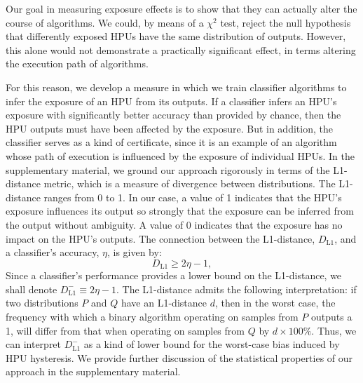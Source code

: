 \documentclass[12pt]{article}
\begin{document}
Our goal in measuring exposure effects is to show that they can actually 
alter the course of algorithms.
We could, by means of a $\chi^2$ test, reject the null hypothesis that
differently exposed HPUs have the same distribution of outputs.
However, this alone would not demonstrate a practically significant effect, in 
terms altering the execution path of algorithms.

For this reason, we develop a measure in which we train classifier algorithms 
to infer the exposure of an HPU from its outputs.
If a classifier infers an HPU's exposure with significantly 
better accuracy than provided by chance, then the HPU outputs must have 
been affected by the exposure.  
But in addition, the classifier serves as a kind of certificate, since it is 
an example of an algorithm whose path of execution is influenced by the 
exposure of 
individual HPUs.  In the supplementary material, we ground our approach 
rigorously in terms of the L1-distance metric, which is a measure of 
divergence between distributions.  The L1-distance ranges from 
0 to 1.  In our case, a value of 1 indicates that the HPU's exposure
influences its output so strongly that the exposure can be inferred from the
output without ambiguity.  A value of 0 indicates that the exposure has no
impact on the HPU's outputs.  The connection between the
L1-distance, $D_\mathrm{L1}$, and a classifier's accuracy, $\eta$, is given by:
\begin{equation}
	D_\mathrm{L1} \geq 2 \eta - 1, 
	\label{l1}
\end{equation}
Since a classifier's performance provides a lower bound on the L1-distance, 
we shall denote $D_\mathrm{L1}^-\equiv 2\eta-1$.
The L1-distance admits the following interpretation: if two distributions
$P$ and $Q$ have an L1-distance $d$, then in the worst case, the 
frequency with which a binary algorithm operating on samples
from $P$ outputs a 1, will differ from that when operating on samples from 
$Q$ by $d \times 100\%$.  
Thus, we can interpret $D_\mathrm{L1}^-$ as a kind of
lower bound for the worst-case bias induced by HPU hysteresis.
We provide further discussion of the statistical properties of our approach 
in the supplementary material.
\end{document}
